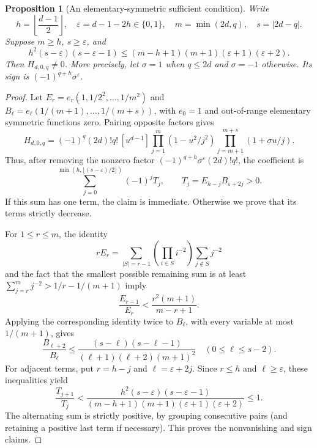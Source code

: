 \documentclass[11pt,a4paper]{article}
\numberwithin{equation}{section}
\newtheorem{proposition}[theorem]{Proposition}
\begin{document}
\begin{proposition}[An elementary-symmetric sufficient condition]\label{aud:ap:prop:k0criterion}
Write
\[
 h=\left\lfloor\frac{d-1}{2}\right\rfloor,\quad
 \varepsilon=d-1-2h\in\{0,1\},\quad
 m=\min(2d,q),\quad s=|2d-q|.
\]
Suppose $m\ge h$, $s\ge\varepsilon$, and
\begin{equation}\label{aud:ap:eq:k0criterion}
 h^2(s-\varepsilon)(s-\varepsilon-1)
 \le (m-h+1)(m+1)(\varepsilon+1)(\varepsilon+2).
\end{equation}
Then $H_{d,0,q}\ne0$. More precisely, let $\sigma=1$ when $q\le2d$ and $\sigma=-1$ otherwise. Its sign is $(-1)^{q+h}\sigma^\varepsilon$.
\end{proposition}
\begin{proof}
Let $E_r=e_r(1,1/2^2,\ldots,1/m^2)$ and
$B_\ell=e_\ell(1/(m+1),\ldots,1/(m+s))$, with $e_0=1$ and out-of-range elementary symmetric functions zero. Pairing opposite factors gives
\[
 H_{d,0,q}=(-1)^q(2d)!q!\,[u^{d-1}]
 \prod_{j=1}^m(1-u^2/j^2)
 \prod_{j=m+1}^{m+s}(1+\sigma u/j).
\]
Thus, after removing the nonzero factor
$(-1)^{q+h}\sigma^\varepsilon(2d)!q!$, the coefficient is
\[
 \sum_{j=0}^{\min(h,\lfloor(s-\varepsilon)/2\rfloor)}
 (-1)^j T_j,
 \qquad T_j=E_{h-j}B_{\varepsilon+2j}>0.
\]
If this sum has one term, the claim is immediate. Otherwise we prove that its terms strictly decrease.

For $1\le r\le m$, the identity
\[
 rE_r=\sum_{|S|=r-1}\left(\prod_{i\in S}i^{-2}\right)
 \sum_{j\notin S}j^{-2}
\]
and the fact that the smallest possible remaining sum is at least
$\sum_{j=r}^m j^{-2}>1/r-1/(m+1)$ imply
\[
 \frac{E_{r-1}}{E_r}
 <\frac{r^2(m+1)}{m-r+1}.
\]
Applying the corresponding identity twice to $B_\ell$, with every variable at most $1/(m+1)$, gives
\[
 \frac{B_{\ell+2}}{B_\ell}
 \le\frac{(s-\ell)(s-\ell-1)}{(\ell+1)(\ell+2)(m+1)^2}
 \quad(0\le\ell\le s-2).
\]
For adjacent terms, put $r=h-j$ and $\ell=\varepsilon+2j$. Since $r\le h$ and $\ell\ge\varepsilon$, these inequalities yield
\[
 \frac{T_{j+1}}{T_j}
 <\frac{h^2(s-\varepsilon)(s-\varepsilon-1)}
 {(m-h+1)(m+1)(\varepsilon+1)(\varepsilon+2)}\le1.
\]
The alternating sum is strictly positive, by grouping consecutive pairs (and retaining a positive last term if necessary). This proves the nonvanishing and sign claims.
\end{proof}
\end{document}
